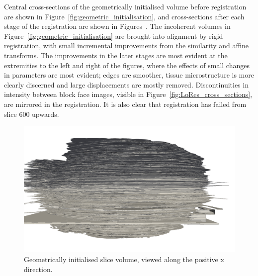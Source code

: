   	Central cross-sections of the geometrically initialised volume before registration are shown in Figure~\ref{fig:geometric_initialisation}, and cross-sections after each stage of the registration are shown in Figures~. The incoherent volumes in Figure~\ref{fig:geometric_initialisation} are brought into alignment by rigid registration, with small incremental improvements from the similarity and affine transforms. The improvements in the later stages are most evident at the extremities to the left and right of the figures, where the effects of small changes in parameters are most evident; edges are smoother, tissue microstructure is more clearly discerned and large displacements are mostly removed. Discontinuities in intensity between block face images, visible in Figure~\ref{fig:LoRes_cross_sections}, are mirrored in the registration. It is also clear that registration has failed from slice 600 upwards.
	
  	\begin{figure}
  	  \centering
  	  \includegraphics[width=0.9\textheight]{Ch6/Figs/Rat28/contours/whole_positive_x_geometric}
  	  \caption{Geometrically initialised slice volume, viewed along the positive x direction.}
  	  \label{fig:positive_x_geometric_contour}
  	\end{figure}

